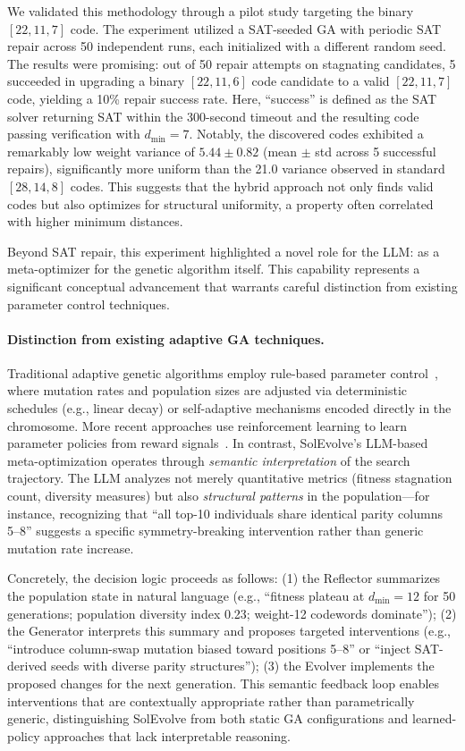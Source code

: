 We validated this methodology through a pilot study targeting the binary $[22,11,7]$ code. The experiment utilized a SAT-seeded GA with periodic SAT repair across 50 independent runs, each initialized with a different random seed. The results were promising: out of 50 repair attempts on stagnating candidates, 5 succeeded in upgrading a binary $[22,11,6]$ code candidate to a valid $[22,11,7]$ code, yielding a 10\% repair success rate. Here, ``success'' is defined as the SAT solver returning SAT within the 300-second timeout and the resulting code passing verification with $d_{\min} = 7$. Notably, the discovered codes exhibited a remarkably low weight variance of $5.44 \pm 0.82$ (mean $\pm$ std across 5 successful repairs), significantly more uniform than the 21.0 variance observed in standard $[28,14,8]$ codes. This suggests that the hybrid approach not only finds valid codes but also optimizes for structural uniformity, a property often correlated with higher minimum distances.

Beyond SAT repair, this experiment highlighted a novel role for the LLM: as a meta-optimizer for the genetic algorithm itself. This capability represents a significant conceptual advancement that warrants careful distinction from existing parameter control techniques.

\paragraph{Distinction from existing adaptive GA techniques.} Traditional adaptive genetic algorithms employ rule-based parameter control~\cite{Eiben1999}, where mutation rates and population sizes are adjusted via deterministic schedules (e.g., linear decay) or self-adaptive mechanisms encoded directly in the chromosome. More recent approaches use reinforcement learning to learn parameter policies from reward signals~\cite{Sharma2019}. In contrast, SolEvolve's LLM-based meta-optimization operates through \textit{semantic interpretation} of the search trajectory. The LLM analyzes not merely quantitative metrics (fitness stagnation count, diversity measures) but also \textit{structural patterns} in the population---for instance, recognizing that ``all top-10 individuals share identical parity columns 5--8'' suggests a specific symmetry-breaking intervention rather than generic mutation rate increase.

Concretely, the decision logic proceeds as follows: (1) the Reflector summarizes the population state in natural language (e.g., ``fitness plateau at $d_{\min}=12$ for 50 generations; population diversity index 0.23; weight-12 codewords dominate''); (2) the Generator interprets this summary and proposes targeted interventions (e.g., ``introduce column-swap mutation biased toward positions 5--8'' or ``inject SAT-derived seeds with diverse parity structures''); (3) the Evolver implements the proposed changes for the next generation. This semantic feedback loop enables interventions that are contextually appropriate rather than parametrically generic, distinguishing SolEvolve from both static GA configurations and learned-policy approaches that lack interpretable reasoning.

